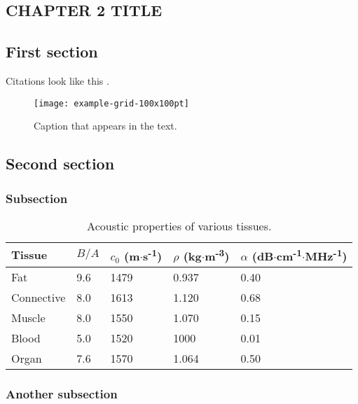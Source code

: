 \documentclass[crop=false,12pt,class=report]{standalone}
\begin{document}
\begin{refsection}
\begin{doublespacing}

\chapter{CHAPTER 2 TITLE}

\section{First section}
\lipsum[11-14]

Citations look like this \cite{Errico2015}.

\begin{figure}
    \centering
    \texttt{[image: example-grid-100x100pt]}
    \caption[Caption that appears in the table of contents.]{Caption that appears in the text.}
    \label{ch2_fig1}
\end{figure}

\section{Second section}
\subsection{Subsection}
\lipsum[15-18]

\begin{table}[t]
    \centering
    \renewcommand{\arraystretch}{1.25}
    \begin{tabular}{lllll}
    \toprule
        Tissue & $B/A$ & $c_0$ (m$\cdot$s\textsuperscript{-1}) & $\rho$ (kg$\cdot$m\textsuperscript{-3}) & $\alpha$ (dB$\cdot$cm\textsuperscript{-1}$\cdot$MHz\textsuperscript{-1})\\
    \midrule
        Fat & 9.6 & 1479 & 0.937 & 0.40\\
        Connective & 8.0 & 1613 & 1.120 & 0.68\\
        Muscle & 8.0 & 1550 & 1.070 & 0.15\\
        Blood & 5.0 & 1520 & 1000 & 0.01\\
        Organ & 7.6 & 1570 & 1.064 & 0.50\\
    \bottomrule
    \end{tabular}
    \caption{Acoustic properties of various tissues.}
    \label{example_table}
\end{table}

\subsection{Another subsection}
\lipsum[19-20]

\newpage
\begin{singlespace}
{
\titlespacing{\chapter}{0pt}{0in}{12pt}
\printbibliography[title=REFERENCES,heading=bibintoc]
}
\end{singlespace}

\end{doublespacing}
\end{refsection}
\end{document}
